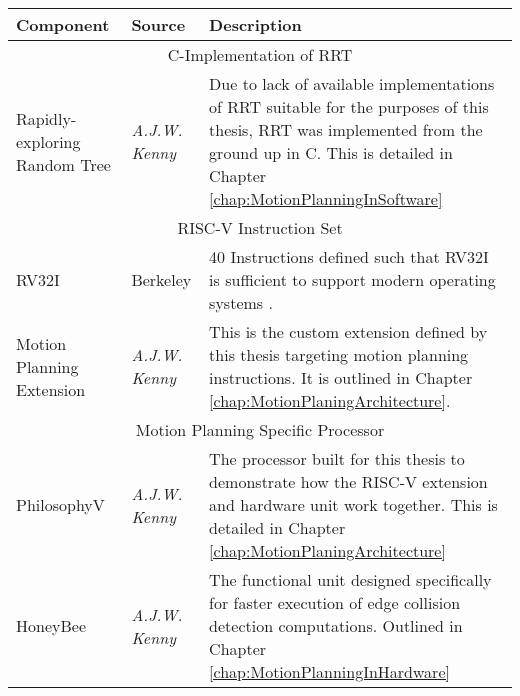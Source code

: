 \begin{table}[t!]
\begin{center}
\begin{tabular}{|p{.2\linewidth}|p{.2\linewidth}|p{.5\linewidth}|}
    \hline
    \textbf{Component}          & \textbf{Source}   & \textbf{Description} \\
    \hline
    \multicolumn{3}{|c|}{C-Implementation of RRT} \\
    \hline
    Rapidly-exploring Random Tree        & \textit{A.J.W. Kenny} & Due to lack of available implementations of \gls{RRT} suitable for the purposes of this thesis, \gls{RRT} was implemented from the ground up in C. This is detailed in Chapter \ref{chap:MotionPlanningInSoftware} \\
    \hline
    \multicolumn{3}{|c|}{RISC-V Instruction Set} \\
    \hline
    \gls{RV32I}              & Berkeley & 40 Instructions defined such that \gls{RV32I} is sufficient to support modern operating systems \cite{Waterman2019}. \\
    \hline
    Motion Planning Extension        & \textit{A.J.W. Kenny} & This is the custom extension defined by this thesis targeting motion planning instructions. It is outlined in Chapter \ref{chap:MotionPlaningArchitecture}. \\
    \hline
    \multicolumn{3}{|c|}{Motion Planning Specific Processor} \\
    \hline
    PhilosophyV     & \textit{A.J.W. Kenny} & The processor built for this thesis to demonstrate how the RISC-V extension and hardware unit work together. This is detailed in Chapter \ref{chap:MotionPlaningArchitecture} \\
    \hline
    HoneyBee        & \textit{A.J.W. Kenny} & The functional unit designed specifically for faster execution of edge collision detection computations. Outlined in Chapter \ref{chap:MotionPlanningInHardware} \\
    \hline
\end{tabular}
\label{table:componentList}
\end{center}
\end{table}